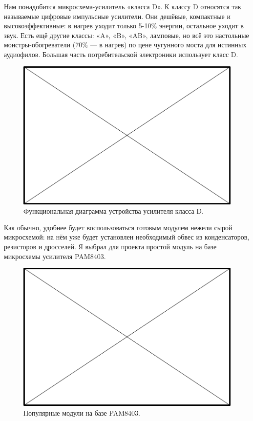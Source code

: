 Нам понадобится микросхема-усилитель «класса D». К классу D относятся так называемые цифровые импульсные усилители. Они дешёвые, компактные и высокоэффективные: в нагрев уходит только 5-10\% энергии, остальное уходит в звук. Есть ещё другие классы: «A», «B», «AB», ламповые, но всё это настольные монстры-обогреватели (70\% — в нагрев) по цене чугунного моста для истинных аудиофилов. Большая часть потребительской электроники использует класс D.

\begin{figure}
  \centering
  \includegraphics{TODO.png}
  \caption{Функциональная диаграмма устройства усилителя класса D.}
  \label{fig:sound-amp-class-d-diagram}
\end{figure}

Как обычно, удобнее будет воспользоваться готовым модулем нежели сырой микросхемой: на нём уже будет установлен необходимый обвес из конденсаторов, резисторов и дросселей. Я выбрал для проекта простой модуль на базе микросхемы усилителя PAM8403.

\begin{figure}
  \centering
  \includegraphics{TODO.png}
  \caption{Популярные модули на базе PAM8403.}
  \label{fig:pam8403-modules}
\end{figure}

